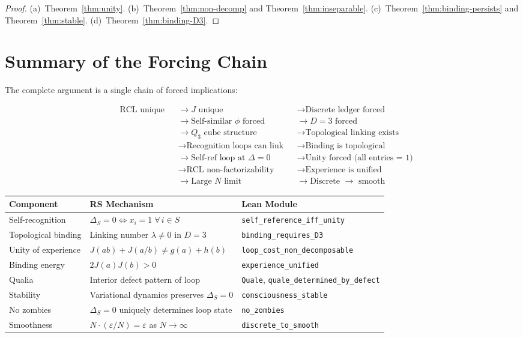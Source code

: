 \documentclass[11pt,a4paper]{article}
\theoremstyle{plain}
\theoremstyle{definition}
\theoremstyle{remark}
\newcommand{\Jcost}{J}
\begin{document}
\begin{proof}
(a)~Theorem~\ref{thm:unity}.
(b)~Theorem~\ref{thm:non-decomp} and Theorem~\ref{thm:inseparable}.
(c)~Theorem~\ref{thm:binding-persists} and Theorem~\ref{thm:stable}.
(d)~Theorem~\ref{thm:binding-D3}.
\end{proof}

\section{Summary of the Forcing Chain}
\label{sec:chain}

The complete argument is a single chain of forced implications:

\[
\boxed{
\begin{aligned}
&\text{RCL unique} &&\to \Jcost \text{ unique}
  &&\to \text{Discrete ledger forced} \\
&&&\to \text{Self-similar } \phi \text{ forced}
  &&\to D = 3 \text{ forced} \\
&&&\to Q_3 \text{ cube structure}
  &&\to \text{Topological linking exists} \\
&&&\to \text{Recognition loops can link}
  &&\to \text{Binding is topological} \\
&&&\to \text{Self-ref loop at } \Delta = 0
  &&\to \text{Unity forced (all entries = 1)} \\
&&&\to \text{RCL non-factorizability}
  &&\to \text{Experience is unified} \\
&&&\to \text{Large } N \text{ limit}
  &&\to \text{Discrete } \to \text{ smooth}
\end{aligned}
}
\]

\begin{center}
\begin{tabular}{@{}lll@{}}
\toprule
\textbf{Component} & \textbf{RS Mechanism} & \textbf{Lean Module} \\
\midrule
Self-recognition & $\Delta_S = 0 \iff x_i = 1\;\forall\,i \in S$
  & \texttt{self\_reference\_iff\_unity} \\
Topological binding & Linking number $\lambda \neq 0$ in $D = 3$
  & \texttt{binding\_requires\_D3} \\
Unity of experience & $\Jcost(ab) + \Jcost(a/b) \neq g(a) + h(b)$
  & \texttt{loop\_cost\_non\_decomposable} \\
Binding energy & $2\Jcost(a)\Jcost(b) > 0$
  & \texttt{experience\_unified} \\
Qualia & Interior defect pattern of loop
  & \texttt{Quale}, \texttt{quale\_determined\_by\_defect} \\
Stability & Variational dynamics preserves $\Delta_S = 0$
  & \texttt{consciousness\_stable} \\
No zombies & $\Delta_S = 0$ uniquely determines loop state
  & \texttt{no\_zombies} \\
Smoothness & $N \cdot (\varepsilon/N) = \varepsilon$ as $N \to \infty$
  & \texttt{discrete\_to\_smooth} \\
\bottomrule
\end{tabular}
\end{center}
\end{document}
